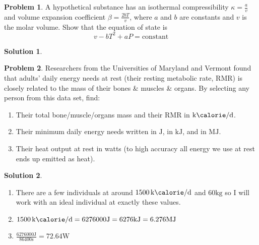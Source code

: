 \documentclass[10pt]{article}
\theoremstyle{definition}
\newtheorem{problem}{Problem}
\newtheorem{soln}{Solution}
\begin{document}
\begin{problem}
A hypothetical substance has an isothermal compressibility $\kappa = \frac{a}{v}$ and volume expansion coefficient $\beta=\frac{2bT}{v}$,
where $a$ and $b$ are constants and $v$ is the molar volume. Show that the equation of state is $$v-bT^2+aP=\mathrm{constant}$$
\end{problem}
\begin{soln}
\end{soln}

\begin{problem}
Researchers from the Universities of Maryland and Vermont found that adults' daily energy needs at rest (their resting metabolic rate, RMR)
is closely related to the mass of their bones \& muscles \& organs. By selecting any person from this data set, find:
\begin{enumerate}[label=(\alph*)]
  \item Their total bone/muscle/organs mass and their RMR in $\unit{\kilo\calorie\per\day}$.
  \item Their minimum daily energy needs written in $\unit{\joule}$, in $\unit{\kilo\joule}$, and in $\unit{\mega\joule}$.
  \item Their heat output at rest in watts (to high accuracy all energy we use at rest ends up emitted as heat).
\end{enumerate}
\end{problem}
\begin{soln}~
  \begin{enumerate}[label=(\alph*)]
    \item There are a few individuals at around $\qty{1500}{\kilo\calorie\per\day}$ and $60\unit{\kilo\gram}$ so I will work with an ideal individual
          at exactly these values.
    \item $\qty{1500}{\kilo\calorie\per\day}=6276000\unit{\joule}=6276\unit{\kilo\joule}=6.276\unit{\mega\joule}$
    \item $\displaystyle\frac{6276000\unit{\joule}}{86400\unit{\second}}=72.64\unit{\watt}$
  \end{enumerate}
\end{soln}
\end{document}
